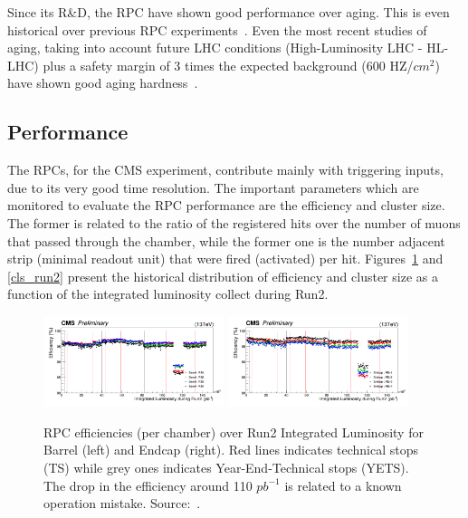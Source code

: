 Since its R\&D, the RPC have shown good performance over aging. This is even historical over previous RPC experiments~\cite{Bressi:1987kg,Ge:2014tea,Abbrescia:1993xy,Antoniazzi:1992dg,DiCiaccio:1992di,deAsmundis:1995dq,Boutigny:1995ib}. Even the most recent studies of aging, taking into account future LHC conditions (High-Luminosity LHC - HL-LHC) plus a safety margin of 3 times the expected background (600 HZ/$cm^2$) have shown good aging hardness~\cite{andrea_rpc_2018}.

\subsection{Performance}

The RPCs, for the CMS experiment, contribute mainly with triggering inputs, due to its very good time resolution. The important parameters which are monitored to evaluate the RPC performance are the efficiency and cluster size. The former is related to the ratio of the registered hits over the number of muons that passed through the chamber, while the former one is the number adjacent strip (minimal readout unit) that were fired (activated) per hit. Figures~\ref{eff_run2} and \ref{cls_run2} present the historical distribution of efficiency and cluster size as a function of the integrated luminosity collect during Run2.

\begin{figure}[htbp]
    \centering
    \includegraphics[width=0.47\textwidth,keepaspectratio]{figures_and_tables/rpc/performance/barrel_eff_vs_intL.png}
    \includegraphics[width=0.47\textwidth,keepaspectratio]{figures_and_tables/rpc/performance/endcap_eff_vs_intL.png}
    \caption{RPC efficiencies (per chamber) over Run2 Integrated Luminosity for Barrel (left) and Endcap (right). Red lines indicates technical stops (TS) while grey ones indicates Year-End-Technical stops (YETS). The drop in the efficiency around 110 $pb^{-1}$ is related to a known operation mistake. Source:~\cite{rpc_run2_performance}.}
    \label{eff_run2}
\end{figure}

